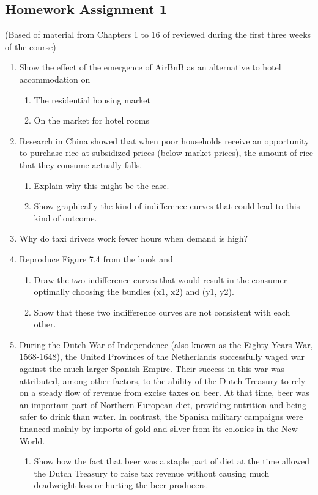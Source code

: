 \documentclass{article}
\begin{document}
\subsection*{Homework Assignment 1}
(Based of material from Chapters 1 to 16 of \textcite{Valrian_Inter_Micro} reviewed during the first three weeks of the course)
\begin{enumerate}
  \item Show the effect of the emergence of AirBnB as an alternative to hotel accommodation on
  \begin{enumerate}
    \item The residential housing market
    \item On the market for hotel rooms
  \end{enumerate}
  \item Research in China showed that when poor households receive an opportunity to purchase rice at subsidized prices (below market prices), the amount of rice that they consume actually falls.
  \begin{enumerate}
    \item Explain why this might be the case.
    \item Show graphically the kind of indifference curves that could lead to this kind of outcome.
  \end{enumerate}
  \item Why do taxi drivers work fewer hours when demand is high?
  \item Reproduce Figure 7.4 from the book and
  \begin{enumerate}
    \item Draw the two indifference curves that would result in the consumer optimally choosing the bundles (x1, x2) and (y1, y2).
    \item Show that these two indifference curves are not consistent with each other.
    \end{enumerate}
  \item During the Dutch War of Independence (also known as the Eighty Years War, 1568-1648), the United Provinces of the Netherlands successfully waged war against the much larger Spanish Empire. Their success in this war was attributed, among other factors, to the ability of the Dutch Treasury to rely on a steady flow of revenue from excise taxes on beer. At that time, beer was an important part of Northern European diet, providing nutrition and being safer to drink than water. In contrast, the Spanish military campaigns were financed mainly by imports of gold and silver from its colonies in the New World.
  \begin{enumerate}
    \item Show how the fact that beer was a staple part of diet at the time allowed the Dutch Treasury to raise tax revenue without causing much deadweight loss or hurting the beer producers.
  \end{enumerate}

\end{enumerate}

\printbibliography
\end{document}
